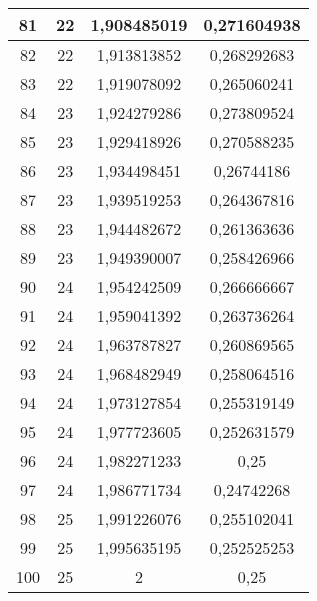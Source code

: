 {\begin{minipage}[!h]{0.45\textwidth}
\begin{longtable}{cccc}
81 & 22 & 1,908485019 & 0,271604938 \\ \hline
82 & 22 & 1,913813852 & 0,268292683 \\ \hline
83 & 22 & 1,919078092 & 0,265060241 \\ \hline
84 & 23 & 1,924279286 & 0,273809524 \\ \hline
85 & 23 & 1,929418926 & 0,270588235 \\ \hline
86 & 23 & 1,934498451 & 0,26744186 \\ \hline
87 & 23 & 1,939519253 & 0,264367816 \\ \hline
88 & 23 & 1,944482672 & 0,261363636 \\ \hline
89 & 23 & 1,949390007 & 0,258426966 \\ \hline
90 & 24 & 1,954242509 & 0,266666667 \\ \hline
91 & 24 & 1,959041392 & 0,263736264 \\ \hline
92 & 24 & 1,963787827 & 0,260869565 \\ \hline
93 & 24 & 1,968482949 & 0,258064516 \\ \hline
94 & 24 & 1,973127854 & 0,255319149 \\ \hline
95 & 24 & 1,977723605 & 0,252631579 \\ \hline
96 & 24 & 1,982271233 & 0,25 \\ \hline
97 & 24 & 1,986771734 & 0,24742268 \\ \hline
98 & 25 & 1,991226076 & 0,255102041 \\ \hline
99 & 25 & 1,995635195 & 0,252525253 \\ \hline
100 & 25 & 2 & 0,25 \\ \hline
\end{longtable}
\end{minipage}




}
